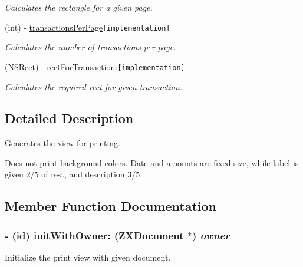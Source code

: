 \begin{CompactItemize}
\begin{CompactList}\small\item\em Calculates the rectangle for a given page. \item\end{CompactList}\item 
(int) - \hyperlink{interface_z_x_print_transaction_view_d60b05e1c3fb49619c603ae70489f422}{transactionsPerPage}{\tt  \mbox{[}implementation\mbox{]}}
\begin{CompactList}\small\item\em Calculates the number of transactions per page. \item\end{CompactList}\item 
(NSRect) - \hyperlink{interface_z_x_print_transaction_view_7f719de4df038472fe764489e782605c}{rectForTransaction:}{\tt  \mbox{[}implementation\mbox{]}}
\begin{CompactList}\small\item\em Calculates the required rect for given transaction. \item\end{CompactList}\end{CompactItemize}


\subsection{Detailed Description}
Generates the view for printing. 

Does not print background colors. Date and amounts are fixed-size, while label is given 2/5 of rest, and description 3/5. 

\subsection{Member Function Documentation}
\hypertarget{interface_z_x_print_transaction_view_78bbca384b07eeb77a7aaba3b81e473b}{
\subsubsection[{initWithOwner:}]{\setlength{\rightskip}{0pt plus 5cm}- (id) initWithOwner: ({\bf ZXDocument} $\ast$) {\em owner}}}
\label{interface_z_x_print_transaction_view_78bbca384b07eeb77a7aaba3b81e473b}


Initialize the print view with given document. 

